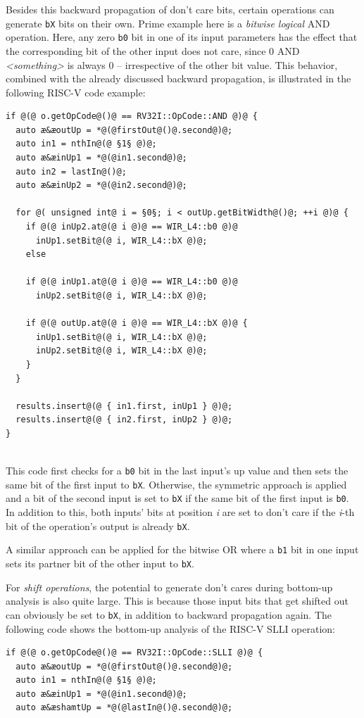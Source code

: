 \begin{enumerate}[resume]
  Besides this backward propagation of don't care bits, certain operations can generate \texttt{bX} bits on their own.
  Prime example here is a \emph{bitwise logical} AND operation.
  Here, any zero \texttt{b0} bit in one of its input parameters has the effect that the corresponding bit of the other input does not care, since 0 AND \emph{<something>} is always 0 -- irrespective of the other bit value.
  This behavior, combined with the already discussed backward propagation, is illustrated in the following RISC-V code example: \\
\begin{lstlisting}[style=code,float=!h,xleftmargin=10mm,aboveskip=-0.8 \baselineskip,belowskip=-0.8 \baselineskip]
if @(@ o.getOpCode@()@ == RV32I::OpCode::AND @)@ {
  auto æ&æoutUp = *@(@firstOut@()@.second@)@;
  auto in1 = nthIn@(@ §1§ @)@;
  auto æ&æinUp1 = *@(@in1.second@)@;
  auto in2 = lastIn@()@;
  auto æ&æinUp2 = *@(@in2.second@)@;

  for @( unsigned int@ i = §0§; i < outUp.getBitWidth@()@; ++i @)@ {
    if @(@ inUp2.at@(@ i @)@ == WIR_L4::b0 @)@
      inUp1.setBit@(@ i, WIR_L4::bX @)@;
    else

    if @(@ inUp1.at@(@ i @)@ == WIR_L4::b0 @)@
      inUp2.setBit@(@ i, WIR_L4::bX @)@;

    if @(@ outUp.at@(@ i @)@ == WIR_L4::bX @)@ {
      inUp1.setBit@(@ i, WIR_L4::bX @)@;
      inUp2.setBit@(@ i, WIR_L4::bX @)@;
    }
  }

  results.insert@(@ { in1.first, inUp1 } @)@;
  results.insert@(@ { in2.first, inUp2 } @)@;
}
\end{lstlisting}
  \\
  This code first checks for a \texttt{b0} bit in the last input's up value and then sets the same bit of the first input to \texttt{bX}.
  Otherwise, the symmetric approach is applied and a bit of the second input is set to \texttt{bX} if the same bit of the first input is \texttt{b0}.
  In addition to this, both inputs' bits at position \emph{i} are set to don't care if the \emph{i}-th bit of the operation's output is already \texttt{bX}.

  A similar approach can be applied for the bitwise OR where a \texttt{b1} bit in one input sets its partner bit of the other input to \texttt{bX}.

  For \emph{shift operations}, the potential to generate don't cares during bottom-up analysis is also quite large.
  This is because those input bits that get shifted out can obviously be set to \texttt{bX}, in addition to backward propagation again.
  The following code shows the bottom-up analysis of the RISC-V SLLI operation: \\
\begin{lstlisting}[style=code,float=!h,xleftmargin=10mm,aboveskip=-0.8 \baselineskip,belowskip=-0.8 \baselineskip]
if @(@ o.getOpCode@()@ == RV32I::OpCode::SLLI @)@ {
  auto æ&æoutUp = *@(@firstOut@()@.second@)@;
  auto in1 = nthIn@(@ §1§ @)@;
  auto æ&æinUp1 = *@(@in1.second@)@;
  auto æ&æshamtUp = *@(@lastIn@()@.second@)@;


\end{lstlisting}
\end{enumerate}

